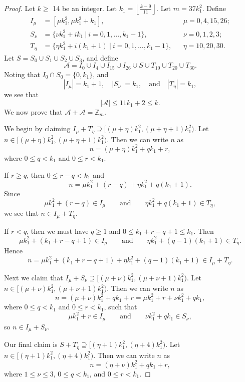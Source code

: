 \documentclass[11pt]{article}
\theoremstyle{definition}
\def\Z{\mbox{$\mathbb Z$}}
\begin{document}
\begin{proof}
Let $k \geq$ 14 be an integer. Let $\displaystyle k_1 = \left \lfloor \frac{k - 9}{11} \right \rfloor$. Let $m = 37k_1^2$.  Define 
\begin{align*}
I_\mu &= [\mu k_1^2, \mu k_1^2 + k_1],
&&\mu = 0, 4, 15, 26; \\
S_\nu &= \{\nu k_1^2 + ik_1 \ |\  i = 0 , 1, ... , k_1 - 1\},
&&\nu = 0, 1, 2, 3;\\
T_{\eta} &= \{\eta k_1^2+ i(k_1 + 1) \ |\   i = 0 , 1, ... , k_1 -1\},
&&\eta = 10, 20, 30.
\end{align*}
 Let $S= S_{0} \cup S_{1} \cup S_{2} \cup S_{3}$, and
define
\[
\mathcal{A}=I_0\cup I_4\cup I_{15}\cup I_{26}\cup S\cup T_{10}\cup T_{20}\cup T_{30}.
\]
Noting  that $I_0\cap S_0=\{0,k_1\}$, and 
\[
|I_\mu| = k_1 + 1,\quad 
|S_\nu| = k_1,\quad\text{and}\quad
|T_\eta| = k_1,
\]
we see that 
\[
|\mathcal{A|} \leq 11k_1 + 2 \leq k.
\]  
We now prove that $\mathcal{A}+\mathcal{A}=\Z_m$.

We begin by claiming $I_{\mu}+T_{\eta}\supseteq[(\mu + \eta )k_1^2 ,  (\mu + \eta  + 1)k_1^2)$. Let $n \in[(\mu + \eta )k_1^2 ,  (\mu + \eta  + 1)k_1^2)$.
Then we can write $n$ as 
\[
n = (\mu + \eta ) k_1^2 + qk_1 + r,
\]
where $0 \leq q < k_1$ and $0 \leq r < k_1$.

If $r \geq q$, then $0\le r-q<k_{1}$ and
\[
n = \mu k_1^2 +  (r - q)+ \eta k_1^2 + q(k_1+1).
\]
 Since 
 \[
 \mu k_1^2 + (r - q) \in I_\mu\qquad\text{and}\qquad \eta k_1^2 +q(k_1+1) \in T_\eta,
 \]
we see that $n \in I_{\mu}+T_{\eta}$. 

If $r < q$, then we must have $q \geq 1$ and $0\le k_{1}+r-q+1\le k_{1}$. Then
\[
\mu k_1^2 + (k_1 + r - q + 1) \in I_\mu \qquad \text{and}\qquad
\eta k_1^2 + (q - 1)(k_1 + 1) \in T_\eta.
\]
 Hence
\[
n = \mu k_1^2 + (k_1 + r - q + 1)+\eta k_1^2 + (q - 1)(k_1 + 1) \in I_{\mu}+T_{\eta}.
\]
 

Next we claim that  $I_{\mu}+S_{\nu}\supseteq[(\mu + \nu )k_1^2 ,  (\mu + \nu  + 1)k_1^2)$. Let $n \in[(\mu + \nu )k_1^2 ,  (\mu + \nu  + 1)k_1^2)$.
Then we can write $n$ as 
\[
n = (\mu + \nu ) k_1^2 + qk_1 + r = \mu k_1^2 + r+\nu k_1^2 + qk_1,
\]
where  $0 \leq q < k_1$ and $0 \leq r < k_1$, such that 
\[
\mu k_1^2 + r \in I_\mu \qquad\text{and}\qquad\nu k_1^2 + qk_1 \in S_\nu,
\]
 so $n \in I_{\mu}+S_{\nu}$. 

Our final claim is $S+T_\eta \supseteq[(\eta  +1)k_1^2 ,  (\eta  + 4)k_1^2)$.  Let $n \in[(\eta  +1)k_1^2 ,  (\eta  + 4)k_1^2)$.
Then we can write $n$ as 
\[
n = (\eta  + \nu ) k_1^2 + qk_1 + r, 
\]
where $1 \leq \nu  \leq 3$, $0 \leq q < k_1$, and $0 \leq r < k_1$. 


\end{proof}
\end{document}
